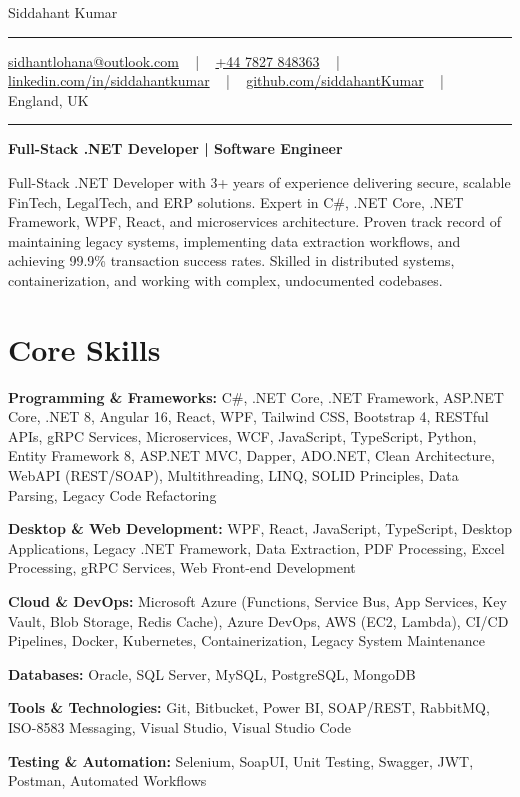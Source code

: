 \documentclass[letterpaper,10pt]{article}
\newcommand{\documentTitle}[2]{
  \begin{center}
    \vspace*{-0.3in}
    {\Huge\color{accentTitle} #1}
    \vspace{8pt}
    {\color{accentLine} \hrule}
    \vspace{2pt}
    \footnotesize{#2}
    \vspace{2pt}
    {\color{accentLine} \hrule}
  \end{center}
}
\newenvironment{resume_list}{
  \vspace{-7pt}
  \begin{itemize}[itemsep=-2px, parsep=1pt, leftmargin=30pt]
}{
  \end{itemize}
}
\begin{document}
\documentTitle{Siddahant Kumar}{
\vspace{0.1cm}
\href{mailto:sidhantlohana@outlook.com}{sidhantlohana@outlook.com} ~ | ~
\href{tel:+447827848363}{+44 7827 848363} ~ | ~
\href{https://www.linkedin.com/in/siddahantkumar/}{linkedin.com/in/siddahantkumar} ~ | ~
\href{https://github.com/siddahantKumar}{github.com/siddahantKumar} ~ | ~
England, UK
}

\begin{center}
\textbf{Full-Stack .NET Developer | Software Engineer}
\end{center}

Full-Stack .NET Developer with 3+ years of experience delivering secure, scalable FinTech, LegalTech, and ERP solutions. Expert in C\#, .NET Core, .NET Framework, WPF, React, and microservices architecture. Proven track record of maintaining legacy systems, implementing data extraction workflows, and achieving 99.9\% transaction success rates. Skilled in distributed systems, containerization, and working with complex, undocumented codebases.


\section{Core Skills}

\begin{resume_list}
    \item \textbf{Programming \& Frameworks:} C\#, .NET Core, .NET Framework, ASP.NET Core, .NET 8, Angular 16, React, WPF, Tailwind CSS, Bootstrap 4, RESTful APIs, gRPC Services, Microservices, WCF, JavaScript, TypeScript, Python, Entity Framework 8, ASP.NET MVC, Dapper, ADO.NET, Clean Architecture, WebAPI (REST/SOAP), Multithreading, LINQ, SOLID Principles, Data Parsing, Legacy Code Refactoring
    \item \textbf{Desktop \& Web Development:} WPF, React, JavaScript, TypeScript, Desktop Applications, Legacy .NET Framework, Data Extraction, PDF Processing, Excel Processing, gRPC Services, Web Front-end Development
    \item \textbf{Cloud \& DevOps:} Microsoft Azure (Functions, Service Bus, App Services, Key Vault, Blob Storage, Redis Cache), Azure DevOps, AWS (EC2, Lambda), CI/CD Pipelines, Docker, Kubernetes, Containerization, Legacy System Maintenance
    \item \textbf{Databases:} Oracle, SQL Server, MySQL, PostgreSQL, MongoDB
    \item \textbf{Tools \& Technologies:} Git, Bitbucket, Power BI, SOAP/REST, RabbitMQ, ISO-8583 Messaging, Visual Studio, Visual Studio Code
    \item \textbf{Testing \& Automation:} Selenium, SoapUI, Unit Testing, Swagger, JWT, Postman, Automated Workflows
\end{resume_list}
\end{document}
